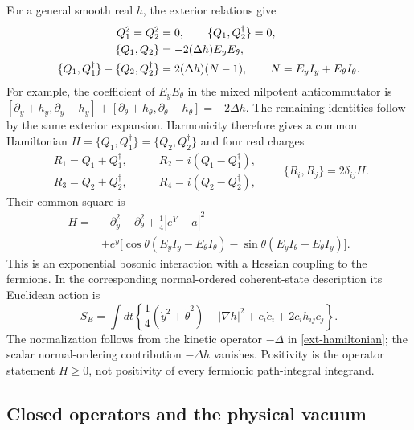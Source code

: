 For a general smooth real $h$, the exterior relations give
\begin{align}
 Q_1^2=Q_2^2&=0,\qquad \{Q_1,Q_2^\dagger\}=0,\notag\\
 \{Q_1,Q_2\}&=-2(\Delta h)E_yE_\theta,\notag\\
 \{Q_1,Q_1^\dagger\}-\{Q_2,Q_2^\dagger\}
   &=2(\Delta h)(N-1),\qquad
 N=E_yI_y+E_\theta I_\theta.
 \label{ext-algebra-defects}
\end{align}
For example, the coefficient of $E_yE_\theta$ in the mixed nilpotent
anticommutator is
$[\partial_y+h_y,\partial_y-h_y]
+[\partial_\theta+h_\theta,\partial_\theta-h_\theta]
=-2\Delta h$.  The remaining identities follow by the same exterior
expansion.  Harmonicity therefore gives a common Hamiltonian
$H=\{Q_1,Q_1^\dagger\}=\{Q_2,Q_2^\dagger\}$ and four real charges
\begin{equation}
 \begin{split}
 R_1=Q_1+Q_1^\dagger,&\qquad R_2=i(Q_1-Q_1^\dagger),\\
 R_3=Q_2+Q_2^\dagger,&\qquad R_4=i(Q_2-Q_2^\dagger),
 \end{split}
 \qquad \{R_i,R_j\}=2\delta_{ij}H.
 \label{ext-real-algebra}
\end{equation}
Their common square is
\begin{equation}
 \begin{split}
 H={}&-\partial_y^2-\partial_\theta^2+\frac14|e^Y-a|^2\\
 &+e^y\bigl[\cos\theta(E_yI_y-E_\theta I_\theta)
             -\sin\theta(E_yI_\theta+E_\theta I_y)\bigr].
 \end{split}
 \label{ext-hamiltonian}
\end{equation}
This is an exponential bosonic interaction with a Hessian coupling to
the fermions.  In the corresponding normal-ordered coherent-state
description its Euclidean action is
\begin{equation}
 S_E=\int dt\left\{
 \frac14(\dot y^2+\dot\theta^2)+|\nabla h|^2
 +\bar c_i\dot c_i+2\bar c_i h_{ij}c_j\right\}.
 \label{ext-action}
\end{equation}
The normalization follows from the kinetic operator $-\Delta$ in
\eqref{ext-hamiltonian}; the scalar normal-ordering contribution
$-\Delta h$ vanishes.  Positivity is the operator statement $H\geq0$,
not positivity of every fermionic path-integral integrand.

\subsection{Closed operators and the physical vacuum}
\label{ext-domains-vacuum}

